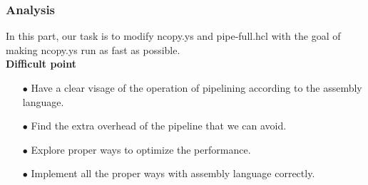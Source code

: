 \documentclass{article}
\begin{document}
\subsubsection{Analysis}
In this part, our task is to modify {\ttfamily ncopy.ys} and {\ttfamily pipe-full.hcl} with the goal of making {\ttfamily ncopy.ys} run as fast as possible.  \\

{\normalsize\bfseries Difficult point}
\begin{itemize}
\item[$\bullet$]Have a clear visage of the operation of pipelining according to the assembly language.
\item[$\bullet$]Find the extra overhead of the pipeline that we can avoid.
\item[$\bullet$]Explore proper ways to optimize the performance.
\item[$\bullet$]Implement all the proper ways with assembly language correctly.\\
\end{itemize}
\end{document}
